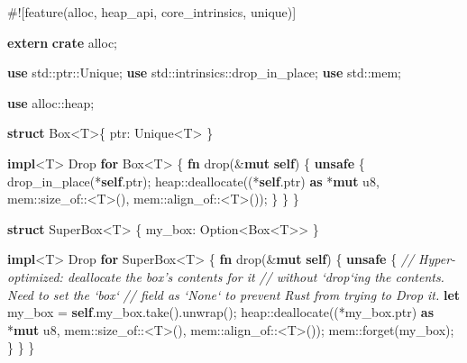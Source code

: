 \documentclass[a4paper,]{book}
\newenvironment{Shaded}{\begin{snugshade}}{\end{snugshade}}
\newcommand{\KeywordTok}[1]{\textcolor[rgb]{0.13,0.29,0.53}{\textbf{{#1}}}}
\newcommand{\DataTypeTok}[1]{\textcolor[rgb]{0.13,0.29,0.53}{{#1}}}
\newcommand{\CommentTok}[1]{\textcolor[rgb]{0.56,0.35,0.01}{\textit{{#1}}}}
\newcommand{\BuiltInTok}[1]{{#1}}
\newcommand{\AttributeTok}[1]{\textcolor[rgb]{0.77,0.63,0.00}{{#1}}}
\newcommand{\NormalTok}[1]{{#1}}
\begin{document}
\begin{Shaded}
\begin{Highlighting}[]
\AttributeTok{#![}\NormalTok{feature}\AttributeTok{(}\NormalTok{alloc}\AttributeTok{,} \NormalTok{heap_api}\AttributeTok{,} \NormalTok{core_intrinsics}\AttributeTok{,} \NormalTok{unique}\AttributeTok{)]}

\KeywordTok{extern} \KeywordTok{crate} \NormalTok{alloc;}

\KeywordTok{use} \NormalTok{std::ptr::Unique;}
\KeywordTok{use} \NormalTok{std::intrinsics::drop_in_place;}
\KeywordTok{use} \NormalTok{std::mem;}

\KeywordTok{use} \NormalTok{alloc::heap;}

\KeywordTok{struct} \DataTypeTok{Box}\NormalTok{<T>\{ ptr: Unique<T> \}}

\KeywordTok{impl}\NormalTok{<T> }\BuiltInTok{Drop} \KeywordTok{for} \DataTypeTok{Box}\NormalTok{<T> \{}
    \KeywordTok{fn} \NormalTok{drop(&}\KeywordTok{mut} \KeywordTok{self}\NormalTok{) \{}
        \KeywordTok{unsafe} \NormalTok{\{}
            \NormalTok{drop_in_place(*}\KeywordTok{self}\NormalTok{.ptr);}
            \NormalTok{heap::deallocate((*}\KeywordTok{self}\NormalTok{.ptr) }\KeywordTok{as} \NormalTok{*}\KeywordTok{mut} \DataTypeTok{u8}\NormalTok{,}
                             \NormalTok{mem::size_of::<T>(),}
                             \NormalTok{mem::align_of::<T>());}
        \NormalTok{\}}
    \NormalTok{\}}
\NormalTok{\}}

\KeywordTok{struct} \NormalTok{SuperBox<T> \{ my_box: }\DataTypeTok{Option}\NormalTok{<}\DataTypeTok{Box}\NormalTok{<T>> \}}

\KeywordTok{impl}\NormalTok{<T> }\BuiltInTok{Drop} \KeywordTok{for} \NormalTok{SuperBox<T> \{}
    \KeywordTok{fn} \NormalTok{drop(&}\KeywordTok{mut} \KeywordTok{self}\NormalTok{) \{}
        \KeywordTok{unsafe} \NormalTok{\{}
            \CommentTok{// Hyper-optimized: deallocate the box's contents for it}
            \CommentTok{// without `drop`ing the contents. Need to set the `box`}
            \CommentTok{// field as `None` to prevent Rust from trying to Drop it.}
            \KeywordTok{let} \NormalTok{my_box = }\KeywordTok{self}\NormalTok{.my_box.take().unwrap();}
            \NormalTok{heap::deallocate((*my_box.ptr) }\KeywordTok{as} \NormalTok{*}\KeywordTok{mut} \DataTypeTok{u8}\NormalTok{,}
                             \NormalTok{mem::size_of::<T>(),}
                             \NormalTok{mem::align_of::<T>());}
            \NormalTok{mem::forget(my_box);}
        \NormalTok{\}}
    \NormalTok{\}}
\NormalTok{\}}
\end{Highlighting}
\end{Shaded}
\end{document}
